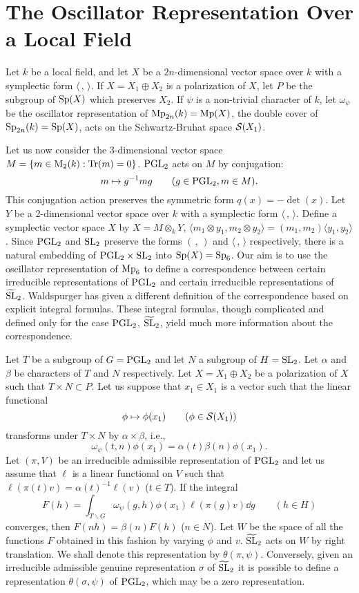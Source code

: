 \section{The Oscillator Representation Over a Local Field}


Let $k$ be a local field, and let $X$ be a $2n$-dimensional vector space over $k$ with a symplectic form $\langle\,,\,\rangle$.
If $X = X_1 \oplus X_2$ is a polarization of $X$, let $P$ be the subgroup of $\mathrm{Sp}(X)$ which preserves $X_2$.
If $\psi$ is a non-trivial character of $k$, let $\omega_\psi$ be the oscillator representation of $\mathrm{Mp}_{2n}(k) = \mathrm{Mp}(X)$, the double cover of $\mathrm{Sp}_{2n}(k) = \mathrm{Sp}(X)$, acts on the Schwartz-Bruhat space $\mathcal{S}(X_1)$.

Let us now consider the 3-dimensional vector space $M = \{m \in \mathrm{M}_2(k): \operatorname*{Tr}(m) = 0\}$.
$\mathrm{PGL}_2$ acts on $M$ by conjugation:
\[
m \mapsto g^{-1} m g \qquad(g \in \mathrm{PGL}_2, m \in M).
\]
This conjugation action preserves the symmetric form $q(x) = -\det(x)$.
Let $Y$ be a 2-dimensional vector space over $k$ with a symplectic form $\langle\,,\,\rangle$.
Define a symplectic vector space $X$ by $X = M \otimes_k Y$,
$\langle m_1 \otimes y_1, m_2 \otimes y_2\rangle = (m_1, m_2) \langle y_1, y_2 \rangle$.
Since $\mathrm{PGL}_2$ and $\mathrm{SL}_2$ preserve
the forms $(\,,\,)$ and $\langle\,,\,\rangle$ respectively, there is a natural embedding of $\mathrm{PGL}_2 \times \mathrm{SL}_2$ into $\mathrm{Sp}(X) = \mathrm{Sp}_6$.
Our aim is to use the oscillator representation of $\mathrm{Mp}_6$ to define a correspondence between certain irreducible representations of $\mathrm{PGL}_2$ and certain irreducible representations of $\widetilde{\mathrm{SL}}_2$.
Waldspurger has given a different definition of the correspondence based on explicit integral formulas.
These integral formulas, though complicated and defined only for the case $\mathrm{PGL}_2$, $\widetilde{\mathrm{SL}}_2$, yield much more information about the correspondence.

Let $T$ be a subgroup of $G = \mathrm{PGL}_2$ and let $N$ a subgroup of $H = \mathrm{SL}_2$.
Let $\alpha$ and $\beta$ be characters of $T$ and $N$ respectively.
Let $X = X_1 \oplus X_2$ be a polarization of $X$ such that $T \times N \subset P$.
Let us suppose that $x_1 \in X_1$ is a vector such that the linear functional
\[
\phi \mapsto \phi(x_1) \qquad (\phi \in \mathcal{S}(X_1))
\]
transforms under $T\times N$ by $\alpha \times \beta$, i.e.,
\[
\omega_\psi(t, n)\phi(x_1) = \alpha(t) \beta(n) \phi(x_1).
\]
Let $(\pi, V)$ be an irreducible admissible representation of $\mathrm{PGL}_2$ and let us assume that $\ell$ is a linear functional on $V$ such that $\ell(\pi(t)v) = \alpha(t)^{-1}\ell(v)$ ($t \in T$).
If the integral
\[
F(h) = \int_{T\backslash G} \omega_\psi(g, h) \phi(x_1) \ell(\pi(g)v)  \dd g \qquad (h \in H)
\]
converges, then $F(nh) = \beta(n)F(h)$ ($n \in N$).
Let $W$ be the space of all the functions $F$ obtained in this fashion by varying $\phi$ and $v$.
$\widetilde{\mathrm{SL}}_2$ acts on $W$ by right translation. We shall denote this representation by $\theta(\pi, \psi)$.
Conversely, given an irreducible admissible genuine representation $\sigma$ of $\widetilde{\mathrm{SL}}_2$ it is possible to define a representation
$\theta(\sigma, \psi)$ of $\mathrm{PGL}_2$, which may be a zero representation.

